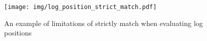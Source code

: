 \begin{figure}[ht]
    \centering
    \texttt{[image: img/log\_position\_strict\_match.pdf]}
    \caption{An example of limitations of strictly match when evaluating log positions}
    \label{fig:strictly_match}
\end{figure}